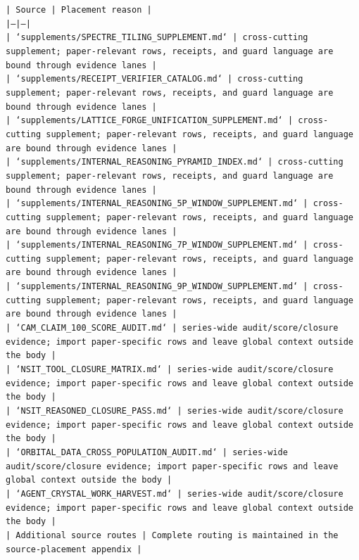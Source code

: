 \documentclass[11pt]{article}
\begin{document}
\noindent\texttt{| Source | Placement reason |}\\
\noindent\texttt{|---|---|}\\
\noindent\texttt{| `supplements/SPECTRE\_TILING\_SUPPLEMENT.md` | cross-cutting supplement; paper-relevant rows, receipts, and guard language are bound through evidence lanes |}\\
\noindent\texttt{| `supplements/RECEIPT\_VERIFIER\_CATALOG.md` | cross-cutting supplement; paper-relevant rows, receipts, and guard language are bound through evidence lanes |}\\
\noindent\texttt{| `supplements/LATTICE\_FORGE\_UNIFICATION\_SUPPLEMENT.md` | cross-cutting supplement; paper-relevant rows, receipts, and guard language are bound through evidence lanes |}\\
\noindent\texttt{| `supplements/INTERNAL\_REASONING\_PYRAMID\_INDEX.md` | cross-cutting supplement; paper-relevant rows, receipts, and guard language are bound through evidence lanes |}\\
\noindent\texttt{| `supplements/INTERNAL\_REASONING\_5P\_WINDOW\_SUPPLEMENT.md` | cross-cutting supplement; paper-relevant rows, receipts, and guard language are bound through evidence lanes |}\\
\noindent\texttt{| `supplements/INTERNAL\_REASONING\_7P\_WINDOW\_SUPPLEMENT.md` | cross-cutting supplement; paper-relevant rows, receipts, and guard language are bound through evidence lanes |}\\
\noindent\texttt{| `supplements/INTERNAL\_REASONING\_9P\_WINDOW\_SUPPLEMENT.md` | cross-cutting supplement; paper-relevant rows, receipts, and guard language are bound through evidence lanes |}\\
\noindent\texttt{| `CAM\_CLAIM\_100\_SCORE\_AUDIT.md` | series-wide audit/score/closure evidence; import paper-specific rows and leave global context outside the body |}\\
\noindent\texttt{| `NSIT\_TOOL\_CLOSURE\_MATRIX.md` | series-wide audit/score/closure evidence; import paper-specific rows and leave global context outside the body |}\\
\noindent\texttt{| `NSIT\_REASONED\_CLOSURE\_PASS.md` | series-wide audit/score/closure evidence; import paper-specific rows and leave global context outside the body |}\\
\noindent\texttt{| `ORBITAL\_DATA\_CROSS\_POPULATION\_AUDIT.md` | series-wide audit/score/closure evidence; import paper-specific rows and leave global context outside the body |}\\
\noindent\texttt{| `AGENT\_CRYSTAL\_WORK\_HARVEST.md` | series-wide audit/score/closure evidence; import paper-specific rows and leave global context outside the body |}\\
\noindent\texttt{| Additional source routes | Complete routing is maintained in the source-placement appendix |}\\
\end{document}
